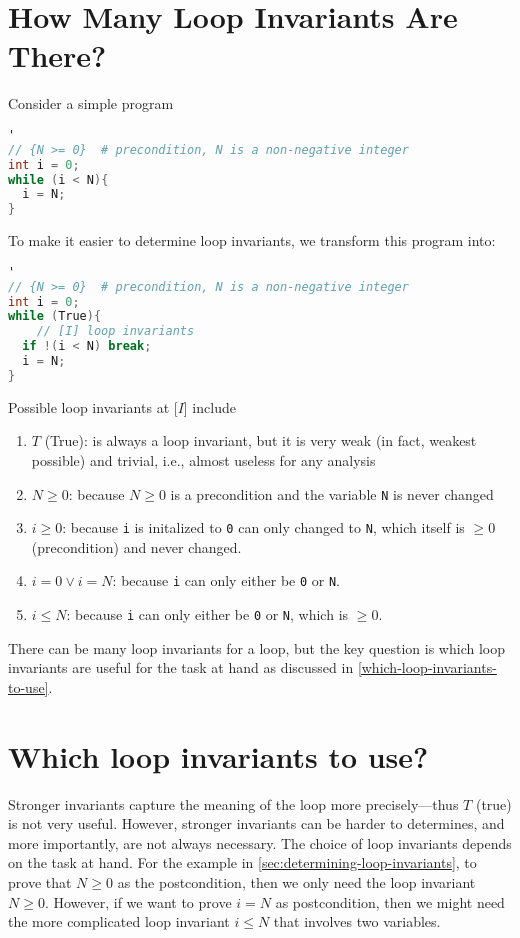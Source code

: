 \documentclass[oneside,11pt,dvipsnames]{book}
\begin{document}
\section{How Many Loop Invariants Are There?}\label{sec:determining-loop-invariants}

Consider a simple
program

\begin{lstlisting}[language=C]'
// {N >= 0}  # precondition, N is a non-negative integer
int i = 0;
while (i < N){
  i = N;
}
\end{lstlisting}

To make it easier to determine loop invariants, we transform
this program into:

\begin{lstlisting}[language=C]'
// {N >= 0}  # precondition, N is a non-negative integer
int i = 0;
while (True){
    // [I] loop invariants 
  if !(i < N) break;
  i = N;
}
\end{lstlisting}

Possible loop invariants at [$I$] include

\begin{enumerate}
\item
  $T$  (True): is always a loop invariant, but it is very weak (in fact, weakest possible) and trivial, i.e., almost useless for any analysis
\item $N \ge 0$: because $N \ge 0$ is a precondition and the variable \texttt{N} is never changed
\item $i \ge 0$: because \texttt{i} is initalized to
  \texttt{0} can only changed to \texttt{N}, which itself is
  $\ge 0$ (precondition) and never changed.
\item  $i = 0 \vee i = N$: because \texttt{i} can only either be \texttt{0} or \texttt{N}.
\item  $i \le N$: because \texttt{i} can only either be \texttt{0} or \texttt{N}, which is $\ge 0$.
\end{enumerate}

There can be many loop invariants for a loop, but the key question is which loop invariants are useful for the task at hand as discussed in \autoref{which-loop-invariants-to-use}.
\section{Which loop invariants to
use?}\label{which-loop-invariants-to-use}

Stronger invariants capture the meaning of the loop more precisely---thus $T$ (true) is not very useful.
However, stronger invariants can be harder to determines, and more importantly, are not always necessary. The choice of loop invariants depends on the task at hand. For the example in \autoref{sec:determining-loop-invariants},  to prove that $N \ge 0$ as the postcondition, then we only need the loop invariant $N \ge 0$. However, if we want to prove  $i=N$ as postcondition, then we might need the more complicated loop invariant $i\le N$ that involves two variables.
\end{document}
